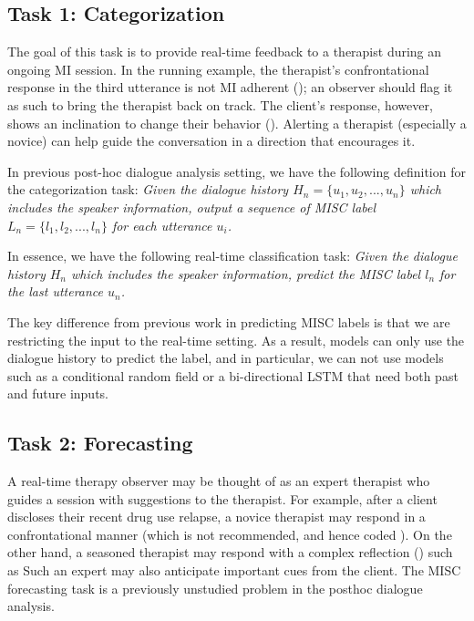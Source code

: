 \subsection{Task 1: Categorization}
\label{ssec:snt:task-categorization}
The goal of this task is to provide real-time feedback to a
therapist during an ongoing MI session. In the running example, the
therapist's confrontational response in the third utterance is not
MI adherent (\MIN); an observer should flag it as such to bring the
therapist back on track. The client's response, however, shows an
inclination to change their behavior (\CHANGE). Alerting a therapist
(especially a novice) can help guide the conversation in a direction
that encourages it.

In previous post-hoc dialogue analysis setting, we have the following
definition for the categorization task: \emph{Given the dialogue
  history $H_n=\{u_{1},u_{2}, ..., u_{n}\}$ which includes the speaker
  information, output a sequence of MISC label
  $L_n=\{l_{1}, l_{2}, ..., l_{n}\}$ for each utterance $u_i$.}

In essence, we have the following real-time classification task:
\emph{Given the dialogue history $H_n$ which includes the speaker
  information, predict the MISC label $l_n$ for the last utterance
  $u_n$.}

The key difference from previous work in predicting MISC labels is
that we are restricting the input to the real-time setting. As a
result, models can only use the dialogue history to predict the label,
and in particular, we can not use models such as a conditional random
field or a bi-directional LSTM that need both past and future inputs.




\subsection{Task 2: Forecasting}
\label{ssec:snt:task-forcasting}
A real-time therapy observer may be thought of as an expert
therapist who guides a session with suggestions to the therapist.
For example, after a client discloses their recent drug use
relapse, a novice therapist may respond in a confrontational manner
(which is not recommended, and hence coded \MIN). On the other
hand, a seasoned therapist may respond with a complex reflection
(\REC) such as 
Such an expert may also anticipate important cues
from the client.%
The MISC forecasting task is a previously unstudied problem in the
posthoc dialogue analysis.

